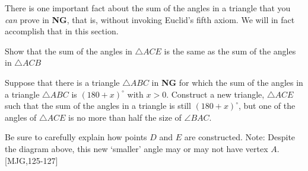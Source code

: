There is one important fact about the sum of the angles in a triangle that you
\textit{can} prove in \textbf{NG}, that is, without invoking Euclid's fifth
axiom. We will in fact accomplish that in this section.

\begin{question}\label{20}
Show that the sum of the angles in $\triangle ACE$ is the same as the
sum of the angles in $\triangle ACB$
\begin{image}
\end{image}
\end{question}

\begin{question}\label{22} 
Suppose that there is a triangle $\triangle ABC$ in
\textbf{NG} for which the sum of the angles in a triangle $\triangle ABC$ is
$\left( 180+x\right)^\circ$ with $x>0$. Construct a new triangle,
$\triangle ACE$ such that the sum of the angles in a triangle is still
$\left( 180+x\right)^\circ$, but one of the angles of $\triangle ACE$
is no more than half the size of $\angle BAC$.
\begin{image}
\end{image}
Be sure to carefully explain how points $D$ and $E$ are constructed.
Note: Despite the diagram above, this new `smaller' angle may or may
not have vertex $A$. [MJG,125-127]
\end{question}

